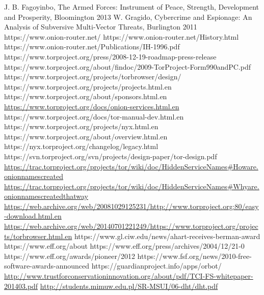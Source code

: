 \begin{thebibliography}{99}
   J. B. Fagoyinbo, The Armed Forces: Instrument of Peace, Strength, Development and Prosperity, Bloomington 2013
   W. Gragido, Cybercrime and Espionage: An Analysis of Subversive Multi-Vector Threats, Burlington 2011
   https://www.onion-router.net/
  https://www.onion-router.net/History.html
   https://www.onion-router.net/Publications/IH-1996.pdf
   https://www.torproject.org/press/2008-12-19-roadmap-press-release
   https://www.torproject.org/about/findoc/2009-TorProject-Form990andPC.pdf
   https://www.torproject.org/projects/torbrowser/design/
   https://www.torproject.org/projects/projects.html.en
   https://www.torproject.org/about/sponsors.html.en
   \url{https://www.torproject.org/docs/onion-services.html.en}
   https://www.torproject.org/docs/tor-manual-dev.html.en
   https://www.torproject.org/projects/nyx.html.en
   https://www.torproject.org/about/overview.html.en
   https://nyx.torproject.org/changelog/legacy.html
   https://svn.torproject.org/svn/projects/design-paper/tor-design.pdf
   \url{https://trac.torproject.org/projects/tor/wiki/doc/HiddenServiceNames#Howare.onionnamescreated}
   \url{https://trac.torproject.org/projects/tor/wiki/doc/HiddenServiceNames#Whyare.onionnamescreatedthatway}
   \url{https://web.archive.org/web/20081029125231/http://www.torproject.org:80/easy-download.html.en}
   \url{https://web.archive.org/web/20140701221249/https://www.torproject.org/projects/torbrowser.html.en}
   https://www.gl.ciw.edu/news/ahart-receives-berman-award
   https://www.eff.org/about
   https://www.eff.org/press/archives/2004/12/21-0
   https://www.eff.org/awards/pioneer/2012
   https://www.fsf.org/news/2010-free-software-awards-announced
   https://guardianproject.info/apps/orbot/
   \url{http://www.trustforconservationinnovation.org/about/pdf/TCI-FS-whitepaper-201403.pdf}
   \url{http://students.mimuw.edu.pl/SR-MSUI/06-dht/dht.pdf}
\end{thebibliography}

